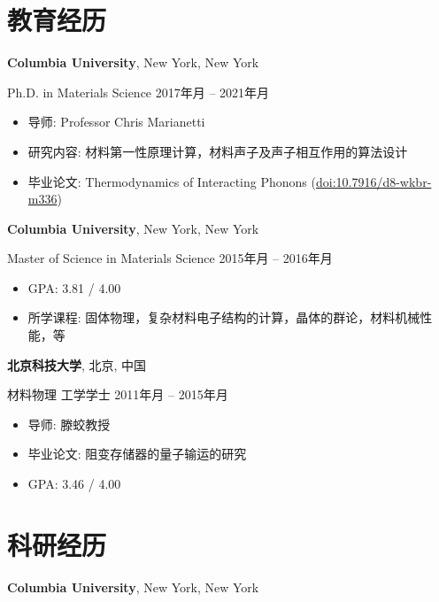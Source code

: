 \documentclass[
  a4paper,
  12pt
]{cv}
\renewcommand{\DatestampYMD}[3]{\mbox{#1年\number#2月}}
\begin{document}
\section{教育经历}

{\textbf{Columbia University}},
New York, New York

Ph.D. in
{Materials Science}
\hfill
\DatestampYMD{2017}{01}{10} --
\DatestampYMD{2021}{10}{20}
\begin{itemize}
\item 导师: Professor Chris Marianetti
\item 研究内容: 材料第一性原理计算，材料声子及声子相互作用的算法设计
\item 毕业论文: Thermodynamics of Interacting Phonons (\href{https://doi.org/10.7916/d8-wkbr-m336}{doi:10.7916/d8-wkbr-m336})
\end{itemize}


{\textbf{Columbia University}},
New York, New York

Master of Science in
{Materials Science}
\hfill
\DatestampYMD{2015}{09}{01} --
\DatestampYMD{2016}{12}{23}
\begin{itemize}
\item GPA: 3.81 / 4.00
\item 所学课程: 固体物理，复杂材料电子结构的计算，晶体的群论，材料机械性能，等
\end{itemize}


{\textbf{北京科技大学}},
北京, 中国

{材料物理} 工学学士
\hfill
\DatestampYMD{2011}{09}{01} --
\DatestampYMD{2015}{06}{26}
\begin{itemize}
\item 导师: 滕蛟教授
\item 毕业论文: 阻变存储器的量子输运的研究
\item GPA: 3.46 / 4.00
\end{itemize}


\section{科研经历}

{\textbf{Columbia University}},
New York, New York
\end{document}
